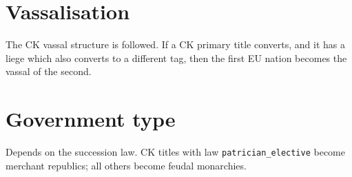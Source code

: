 \documentclass[12pt,ebook,oneside]{book}
\begin{document}
\section{Vassalisation}

The CK vassal structure is followed. If a CK primary title converts,
and it has a liege which also converts to a different tag, then the first EU nation
becomes the vassal of the second. 

\section{Government type}

Depends on the succession law. CK titles with law
\verb|patrician_elective| become merchant republics; all others
become feudal monarchies. 
\end{document}
